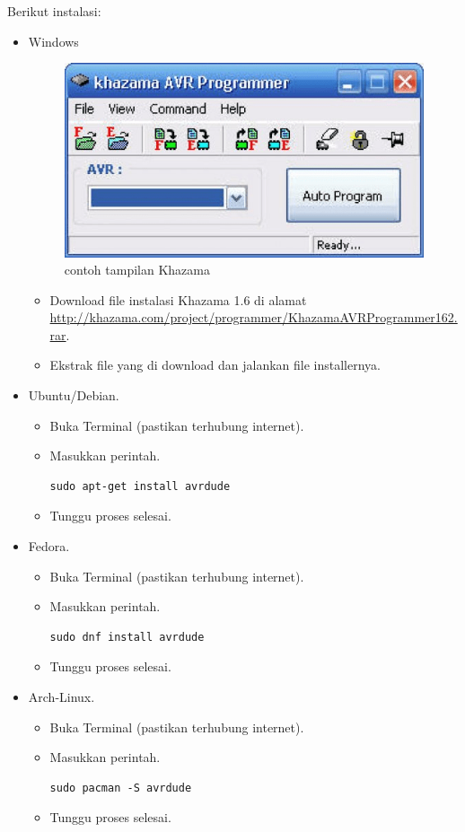 \documentclass[12pt,]{article}
\begin{document}
	Berikut instalasi:
	\begin{itemize}
		\item Windows
		\begin{figure}[H]
			\centering
			\includegraphics[width=0.4\linewidth]{images/khazama}
			\caption{contoh tampilan Khazama}
		\end{figure}
		\begin{itemize}
			\item Download file instalasi Khazama 1.6 di alamat \url{http://khazama.com/project/programmer/KhazamaAVRProgrammer162.rar}.
			\item Ekstrak file yang di download dan jalankan file installernya.
		\end{itemize}
	
		\item Ubuntu/Debian.
		\begin{itemize}
			\item Buka Terminal (pastikan terhubung internet).
			\item Masukkan perintah.
			\begin{verbatim}
sudo apt-get install avrdude
			\end{verbatim}
			\item Tunggu proses selesai.
		\end{itemize}
		
		\item Fedora.
		\begin{itemize}
			\item Buka Terminal (pastikan terhubung internet).
			\item Masukkan perintah.
			\begin{verbatim}
sudo dnf install avrdude
			\end{verbatim}
			\item Tunggu proses selesai.
		\end{itemize}
		
		\item Arch-Linux.
		\begin{itemize}
			\item Buka Terminal (pastikan terhubung internet).
			\item Masukkan perintah.
			\begin{verbatim}
sudo pacman -S avrdude
			\end{verbatim}
			\item Tunggu proses selesai.
		\end{itemize}

	\end{itemize}
\end{document}
